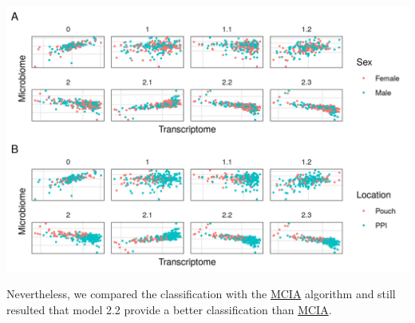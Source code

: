 \documentclass[
  12pt,
  a4paper,
  twoside,
  openright]{book}
\let\origfigure\figure
\let\endorigfigure\endfigure
\renewenvironment{figure}[1][2] {
    \expandafter\origfigure\expandafter[!htbp]
} {
    \endorigfigure
}
\begin{document}
\begin{figure}
\includegraphics[width=1\linewidth]{images/morgan_models} \caption[Models from inteRmodel in the Morgan dataset. ]{Models from inteRmodel in the Morgan dataset. First component of the transcriptome and microbiome of models on the Morgan dataset. Model 0 without sample data. Model 1 to 1.2 with all the sample data in a single block and models 2.1 to 2.3 with sample data in several blocks. Panel A shows samples colored by sex and panel B by segment of the sample. There is no clear classification neither by location nor sex on any of the models.}\label{fig:morgan-models}
\end{figure}

Nevertheless, we compared the classification with the \protect\hyperlink{acronyms_MCIA}{MCIA} algorithm and still resulted that model 2.2 provide a better classification than \protect\hyperlink{acronyms_MCIA}{MCIA}.
\end{document}
